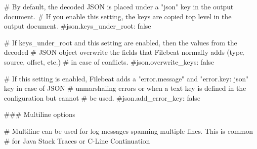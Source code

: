   # By default, the decoded JSON is placed under a "json" key in the output document.
  # If you enable this setting, the keys are copied top level in the output document.
  #json.keys_under_root: false

  # If keys_under_root and this setting are enabled, then the values from the decoded
  # JSON object overwrite the fields that Filebeat normally adds (type, source, offset, etc.)
  # in case of conflicts.
  #json.overwrite_keys: false

  # If this setting is enabled, Filebeat adds a "error.message" and "error.key: json" key in case of JSON
  # unmarshaling errors or when a text key is defined in the configuration but cannot
  # be used.
  #json.add_error_key: false

  ### Multiline options

  # Multiline can be used for log messages spanning multiple lines. This is common
  # for Java Stack Traces or C-Line Continuation

